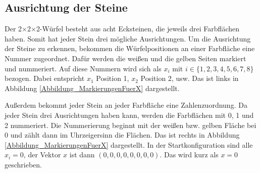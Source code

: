 \documentclass[12pt,a4paper, usenames, dvipsnames]{article}
\theoremstyle{mystyle}
\theoremstyle{definition}
\newcommand{\Ttwo}{2$\times$2$\times$2-}
\begin{document}
%
%
%
%
%
%
%
%
%
%
%
%
%
%
%
%
%
%
%
%
\subsection{Ausrichtung der Steine} 
 \label{Abschnitt_AusrichtungDerSteine}
Der \Ttwo Würfel besteht aus acht Ecksteinen, die jeweils drei Farbflächen haben. Somit hat jeder Stein drei mögliche Ausrichtungen. 
Um die Ausrichtung der Steine zu erkennen, bekommen die Würfelpositionen an einer Farbfläche eine Nummer zugeordnet. Dafür werden die weißen und die gelben Seiten markiert und nummeriert. Auf diese Nummern wird sich als $x_i$ mit $i \in \lbrace 1, 2, 3, 4, 5, 6, 7, 8 \rbrace$ bezogen. Dabei entspricht $x_1$ Position 1, $x_2$ Position 2, usw. Das ist links in Abbildung \ref{Abbildung_MarkierungenFuerX} dargestellt.

Außerdem bekommt jeder Stein an jeder Farbfläche eine Zahlenzuordnung. Da jeder Stein drei Ausrichtungen haben kann, werden die Farbflächen mit 0, 1 und 2 nummeriert. Die Nummerierung beginnt mit der weißen bzw. gelben Fläche bei 0 und zählt dann im Uhrzeigersinn die Flächen. Das ist rechts in Abbildung \ref{Abbildung_MarkierungenFuerX} dargestellt.
In der Startkonfiguration sind alle $x_i = 0$, der Vektor $x$ ist dann $(0, 0, 0, 0, 0, 0, 0, 0)$. Das wird kurz als $x=0$ geschrieben.
\end{document}
